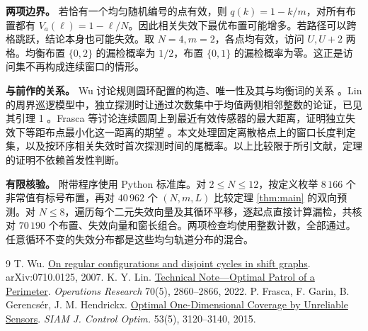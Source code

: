 \documentclass[UTF8,12pt,a4paper,fontset=fandol]{ctexart}
\theoremstyle{plaincn}
\begin{document}
\noindent\textbf{两项边界。}
若恰有一个均匀随机编号的点有效，则 $q(k)=1-k/m$，对所有布置都有 $V_a(\ell)=1-\ell/N$。因此相关失效下最优布置可能增多。若路径可以跨格跳跃，结论本身也可能失效。取 $N=4,m=2$，各点均有效，访问 $U,U+2$ 两格。均衡布置 $\{0,2\}$ 的漏检概率为 $1/2$，布置 $\{0,1\}$ 的漏检概率为零。这正是访问集不再构成连续窗口的情形。

\noindent\textbf{与前作的关系。}
Wu 讨论规则圆环配置的构造、唯一性及其与均衡词的关系 \cite{wu}。Lin 的周界巡逻模型中，独立探测时让通过次数集中于均值两侧相邻整数的论证，已见其引理 1 \cite{lin}。Frasca 等讨论连续圆周上到最近有效传感器的最大距离，证明独立失效下等距布点最小化这一距离的期望 \cite[命题 5]{frasca}。本文处理固定离散格点上的窗口长度判定集，以及按环序相关失效时首次探测时间的尾概率。以上比较限于所引文献，定理的证明不依赖首发性判断。

\noindent\textbf{有限核验。}
附带程序使用 Python 标准库。对 $2\le N\le12$，按定义枚举 $8\,166$ 个非常值有标号布置，再对 $40\,962$ 个 $(N,m,L)$ 比较定理 \ref{thm:main} 的双向预测。对 $N\le8$，遍历每个二元失效向量及其循环平移，逐起点直接计算漏检，共核对 $70\,190$ 个布置、失效向量和窗长组合。两项检查均使用整数计数，全部通过。任意循环不变的失效分布都是这些均匀轨道分布的混合。

{\small
\begin{thebibliography}{9}\setlength{\itemsep}{.12em}
 T. Wu. \href{https://arxiv.org/abs/0710.0125}{On regular configurations and disjoint cycles in shift graphs}. arXiv:0710.0125, 2007.
 K. Y. Lin. \href{https://doi.org/10.1287/opre.2021.2117}{Technical Note—Optimal Patrol of a Perimeter}. \emph{Operations Research} 70(5), 2860--2866, 2022.
 P. Frasca, F. Garin, B. Gerencsér, J. M. Hendrickx. \href{https://doi.org/10.1137/140968094}{Optimal One-Dimensional Coverage by Unreliable Sensors}. \emph{SIAM J. Control Optim.} 53(5), 3120--3140, 2015.
\end{thebibliography}}
\end{document}
